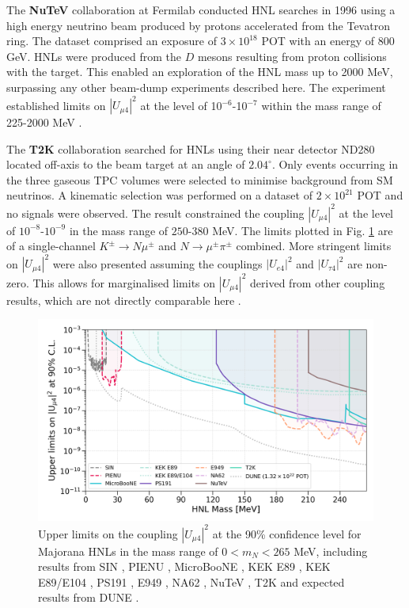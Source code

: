 \begin{coloritemize}
\item The \textbf{NuTeV} collaboration at Fermilab conducted HNL searches in 1996 using a high energy neutrino beam produced by protons accelerated from the Tevatron ring.
The dataset comprised an exposure of $3 \times 10^{18}$ POT with an energy of 800 GeV.
HNLs were produced from the $D$ mesons resulting from proton collisions with the target.
This enabled an exploration of the HNL mass up to 2000 MeV, surpassing any other beam-dump experiments described here.
The experiment established limits on $|U_{\mu4}|^{2}$ at the level of 10$^{-6}$-10$^{-7}$ within the mass range of 225-2000 MeV \cite{NuTeV}.

\item The \textbf{T2K} collaboration searched for HNLs using their near detector ND280 located off-axis to the beam target at an angle of $2.04^\circ$.
Only events occurring in the three gaseous TPC volumes were selected to minimise background from SM neutrinos.
A kinematic selection was performed on a dataset of $2\times10^{21}$ POT and no signals were observed.
The result constrained the coupling $|U_{\mu4}|^2$ at the level of $10^{-8}$-$10^{-9}$ in the mass range of $250$-$380$ MeV. 
The limits plotted in Fig. \ref{fig:sensitivity_theory} are of a single-channel $K^\pm \rightarrow N\mu^\pm$ and $N \rightarrow \mu^\pm\pi^\pm$ combined.
More stringent limits on $|U_{\mu4}|^2$ were also presented assuming the couplings $|U_{e4}|^2$ and $|U_{\tau4}|^2$ are non-zero.
This allows for marginalised limits on $|U_{\mu4}|^2$ derived from other coupling results, which are not directly comparable here \cite{t2k}.

\begin{figure}[t!] 
\centering    
\includegraphics[width=1.0\textwidth]{sensitivity}
\caption[Experimental Limits on the Coupling $|U_{\mu4}|^{2}$ of Heavy Neutral Leptons]{
Upper limits on the coupling $|U_{\mu4}|^{2}$ at the 90\% confidence level for Majorana HNLs in the mass range of $0 < m_{N} < 265$ MeV, 
including results from SIN \cite{SIN3}, PIENU \cite{PIENU}, MicroBooNE \cite{uboone1, uboone2, uboone3}, KEK E89 \cite{KEK2}, KEK E89/E104 \cite{KEK3}, PS191 \cite{PS191C}, E949 \cite{E949}, NA62 \cite{NA62B}, NuTeV \cite{NuTeV}, T2K \cite{t2k} and expected results from DUNE \cite{HNLSilvia}.
}
\label{fig:sensitivity_theory}
\end{figure}


\end{coloritemize}
